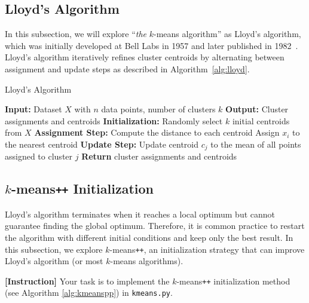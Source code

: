\documentclass[12pt]{article}
\begin{document}
\subsection{Lloyd's Algorithm}
In this subsection, we will explore ``\textit{the} $k$-means algorithm'' as Lloyd's algorithm, which was initially developed at Bell Labs in 1957 and later published in 1982~\cite{1056489}.
Lloyd's algorithm iteratively refines cluster centroids by alternating between assignment and update steps as described in Algorithm~\ref{alg:lloyd}.

\begin{algorithm}
    \caption{Lloyd's Algorithm}
    \label{alg:lloyd}
    \begin{algorithmic}[1]
        \STATE \textbf{Input:} Dataset $X$ with $n$ data points, number of clusters $k$
        \STATE \textbf{Output:} Cluster assignments and centroids
        \STATE \textbf{Initialization:}
        \STATE Randomly select $k$ initial centroids from $X$
        \REPEAT
        \STATE \textbf{Assignment Step:}
        \STATE Compute the distance to each centroid
        \STATE Assign $x_i$ to the nearest centroid
        \ENDFOR
        \STATE \textbf{Update Step:}
        \STATE Update centroid $c_j$ to the mean of all points assigned to cluster $j$
        \ENDFOR
        \STATE \textbf{Return} cluster assignments and centroids
    \end{algorithmic}
\end{algorithm}

\subsection{$k$-means\texttt{++} Initialization}
Lloyd's algorithm terminates when it reaches a local optimum but cannot guarantee finding the global optimum. Therefore, it is common practice to restart the algorithm with different initial conditions and keep only the best result.
In this subsection, we explore $k$-means\texttt{++}, an initialization strategy that can improve Lloyd's algorithm (or most $k$-means algorithms).

\smallskip\noindent
\textbf{[Instruction]}
Your task is to implement the $k$-means\texttt{++} initialization method (see Algorithm \ref{alg:kmeanspp}) in \texttt{kmeans.py}.
\end{document}
